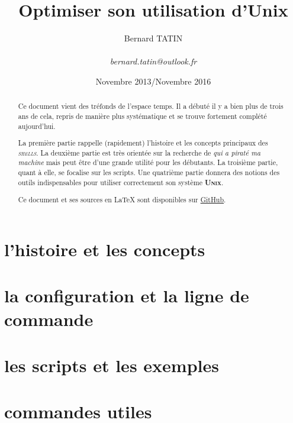 \documentclass[12pt]{amsart} %
\title{Optimiser son utilisation d'Unix}
\author{Bernard TATIN \\
\small \\
\textit{bernard.tatin@outlook.fr}}
\date{Novembre 2013/Novembre 2016} %
\makeatletter
\newcommand\osname[1]{\textsc{\textbf{#1}}\index{#1@\textsc{#1}}\xspace}
\newcommand\unix{\osname{Unix}}
\newcommand\shells{\emph{\textsc{shells}}\xspace{}}
\makeatother
\begin{document}
\begin{abstract}
Ce document vient des tréfonds de l'espace temps. Il a débuté il y a bien plus de trois ans de cela, repris de manière plus systématique et se trouve fortement complété aujourd'hui.

La première partie rappelle (rapidement) l'histoire et les concepts principaux des \shells{}.
La deuxième partie est très orientée sur la recherche de \emph{qui a piraté ma machine} mais peut être
d'une grande utilité pour les débutants. La troisième partie, quant à elle, se focalise sur les scripts.
Une quatrième partie donnera des notions des outils indispensables pour utiliser correctement son système \unix{}.

Ce document et ses sources en \LaTeX{} sont disponibles sur \href{https://github.com/BernardTatin/optimize-unix}{GitHub}.
\end{abstract}

\maketitle

\tableofcontents

\part{l'histoire et les concepts}


\part{la configuration et la ligne de commande}


\part{les scripts et les exemples}


\part{commandes utiles}



\printindex
\end{document}
